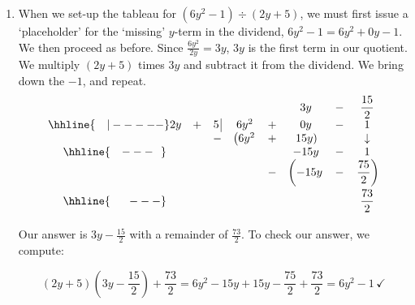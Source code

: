 {\begin{enumerate}
\[\begin{array}{cccccc}
3t & - & 4 \, \vline& 2t & + & 7  \\

 &  &  -& \left(2t\vphantom{\dfrac{8}{3}} \right. & - & \left.  \dfrac{8}{3}\right)  \\ \hhline{~~~---}
 &  &  &   &  & \dfrac{29}{3} \vphantom{\sqrt{\dfrac{7}{7}}} \\ 

 
\end{array}\]
\setlength\arraycolsep{5pt}
\setlength\extrarowheight{0pt}

Our answer is $\frac{2}{3}$ with a remainder of $\frac{29}{3}$.  To check our answer, we compute \[(3t-4) \left(\frac{2}{3}\right) + \frac{29}{3} = 2t - \frac{8}{3} + \frac{29}{3} = 2t + \frac{21}{3} = 2t + 7 \, \checkmark\]

\item When we set-up the tableau for   $\left(6y^2 - 1 \right) \div \left(2y + 5\right)$, we must first issue a `placeholder' for the `missing' $y$-term in the dividend, $6y^2 -1 = 6y^2 + 0y - 1$.  We then proceed as before.  Since $\frac{6y^2}{2y} = 3y$, $3y$ is the first term in our quotient. We multiply $(2y+5)$ times $3y$ and subtract it from the dividend.  We bring down the $-1$, and repeat.  \setlength\arraycolsep{0.1pt}\setlength\extrarowheight{5pt}\[ \begin{array}{cccccccc}

& & & & & 3y & - & \dfrac{15}{2}  \\ \hhline{~~~|-----}

2y& + & 5 \, \vline& 6y^2 & + & 0y & - & 1  \\

 &  &  -& \left(6y^2 \right. & + & \left.  15y\right) &  & \downarrow  \\ \hhline{~~~---~~} 
 &  &  &   &  & -15y & - & 1  \\ 
 &  &  &   & - & \left(-15y\vphantom{\dfrac{75}{2}} \right. & - & \left. \dfrac{75}{2} \right) \\ \hhline{~~~~~---} 
 &  &  &   &   &  & & \dfrac{73}{2} \vphantom{\sqrt{\dfrac{73}{2}}}\\
 
\end{array}\]
\setlength\arraycolsep{5pt}
\setlength\extrarowheight{0pt}
 
Our answer is $3y - \frac{15}{2}$ with a remainder of $\frac{73}{2}$.  To check our answer, we compute:

\[ (2y + 5)\left(3y - \dfrac{15}{2}\right) + \dfrac{73}{2} = 6y^2 - 15y + 15y - \dfrac{75}{2} + \dfrac{73}{2} = 6y^2 - 1 \, \checkmark\]



\end{enumerate}}
